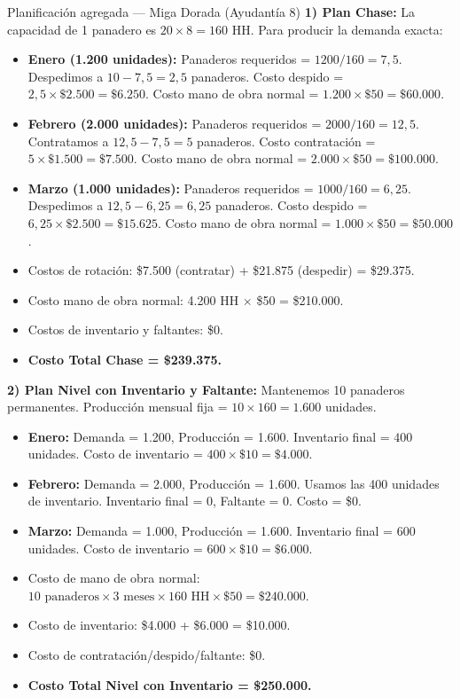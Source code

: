 \begin{ejercicio}{Planificación agregada --- Miga Dorada (Ayudantía 8)}
\textbf{1) Plan Chase:}
La capacidad de 1 panadero es $20 \times 8 = 160$ HH. Para producir la demanda exacta:
\begin{itemize}
  \item \textbf{Enero (1.200 unidades):} Panaderos requeridos = $1200 / 160 = 7,5$. Despedimos a $10 - 7,5 = 2,5$ panaderos. Costo despido = $2,5 \times \$2.500 = \$6.250$. Costo mano de obra normal = $1.200 \times \$50 = \$60.000$.
  \item \textbf{Febrero (2.000 unidades):} Panaderos requeridos = $2000 / 160 = 12,5$. Contratamos a $12,5 - 7,5 = 5$ panaderos. Costo contratación = $5 \times \$1.500 = \$7.500$. Costo mano de obra normal = $2.000 \times \$50 = \$100.000$.
  \item \textbf{Marzo (1.000 unidades):} Panaderos requeridos = $1000 / 160 = 6,25$. Despedimos a $12,5 - 6,25 = 6,25$ panaderos. Costo despido = $6,25 \times \$2.500 = \$15.625$. Costo mano de obra normal = $1.000 \times \$50 = \$50.000$.
\end{itemize}
\begin{itemize}
  \item Costos de rotación: \$7.500 (contratar) + \$21.875 (despedir) = \$29.375.  
  \item Costo mano de obra normal: 4.200 HH $\times$ \$50 = \$210.000.  
  \item Costos de inventario y faltantes: \$0.  
  \item \textbf{Costo Total Chase = \$239.375.}
\end{itemize}

\textbf{2) Plan Nivel con Inventario y Faltante:}
Mantenemos 10 panaderos permanentes. Producción mensual fija = $10 \times 160 = 1.600$ unidades.
\begin{itemize}
  \item \textbf{Enero:} Demanda = 1.200, Producción = 1.600. Inventario final = $400$ unidades. Costo de inventario = $400 \times \$10 = \$4.000$.
  \item \textbf{Febrero:} Demanda = 2.000, Producción = 1.600. Usamos las 400 unidades de inventario. Inventario final = 0, Faltante = 0. Costo = \$0.
  \item \textbf{Marzo:} Demanda = 1.000, Producción = 1.600. Inventario final = $600$ unidades. Costo de inventario = $600 \times \$10 = \$6.000$.
\end{itemize}
\begin{itemize}
  \item Costo de mano de obra normal: $10 \text{ panaderos} \times 3 \text{ meses} \times 160\text{ HH} \times \$50 = \$240.000$.  
  \item Costo de inventario: \$4.000 + \$6.000 = \$10.000.  
  \item Costo de contratación/despido/faltante: \$0.  
  \item \textbf{Costo Total Nivel con Inventario = \$250.000.}
\end{itemize}


\end{ejercicio}
